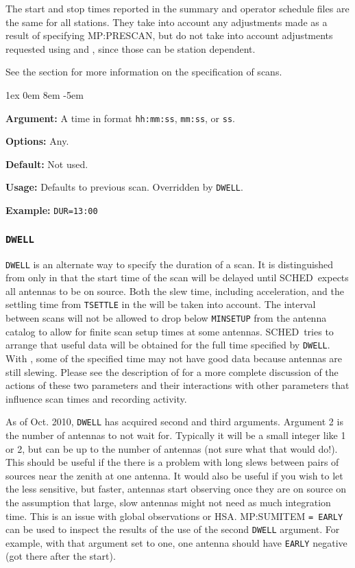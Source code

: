 \documentclass{report}
\newcommand{\schedb}{{\sc SCHED~}}
\newcommand{\rcwbox}[5]{
  \begin{list}{}{\parsep 1ex  \itemsep 0em
                 \leftmargin 8em  \itemindent -5em }
    \item {\bf Argument:} #1
    \item {\bf Options:}  #2
    \item {\bf Default:}  #3
    \item {\bf Usage:}    #4
    \item {\bf Example:}  #5
  \end{list}
}
\begin{document}
The start and stop times reported in the summary and operator schedule
files are the same for all stations.  They take into account any
adjustments made as a result of specifying 
{MP:PRESCAN}, but do not take into account adjustments requested using
 and , since those can be station dependent.

See the  section for more
information on the specification of scans.

\rcwbox
{A time in format {\tt hh:mm:ss}, {\tt mm:ss}, or {\tt ss}.}
{Any.}
{Not used.}
{Defaults to previous scan. Overridden by {\tt DWELL}.}
{{\tt DUR=13:00}}


\subsubsection{\label{MP:DWELL}{\tt DWELL}}

{\tt DWELL} is an alternate way to specify the duration of a scan.  It
is distinguished from  only in that
the start time of the scan will be delayed until \schedb expects all
antennas to be on source.  Both the slew time, including acceleration,
and the settling time from {\tt TSETTLE} in the  will be taken into account.  The interval between
scans will not be allowed to drop below {\tt MINSETUP} from the
antenna catalog to allow for finite scan setup times at some antennas.
\schedb tries to arrange that useful data will be obtained for the
full time specified by {\tt DWELL}.  With , some of the specified time may not have good data
because antennas are still slewing.  Please see the description of
 for a more complete discussion of the
actions of these two parameters and their interactions with other
parameters that influence scan times and recording activity.

As of Oct. 2010, {\tt DWELL} has acquired second and third arguments.
Argument 2 is the number of antennas to not wait for.  Typically it
will be a small integer like 1 or 2, but can be up to the number of
antennas (not sure what that would do!).  This should be useful if the
there is a problem with long slews between pairs of sources near the
zenith at one antenna.  It would also be useful if you wish to let the
less sensitive, but faster, antennas start observing once they are on
source on the assumption that large, slow antennas might not need as
much integration time.  This is an issue with global observations or
HSA.   {MP:SUMITEM} {\tt = EARLY} can be used
to inspect the results of the use of the second {\tt DWELL} argument.
For example, with that argument set to one, one antenna should have
{\tt EARLY} negative (got there after the start).
\end{document}
